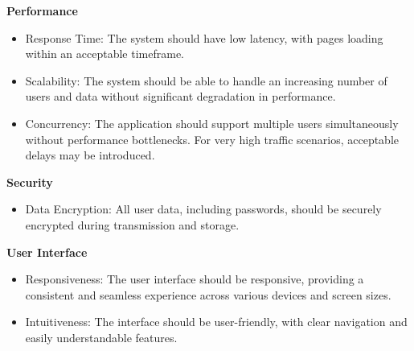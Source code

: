 \textbf{Performance}

\begin{itemize}
    \item Response Time: The system should have low latency, with pages loading within an acceptable timeframe.
    \item Scalability: The system should be able to handle an increasing number of users and data without significant degradation in performance.
    \item Concurrency: The application should support multiple users simultaneously without performance bottlenecks. For very high traffic scenarios, acceptable delays may be introduced.
\end{itemize}

\textbf{Security}

\begin{itemize}
    \item Data Encryption: All user data, including passwords, should be securely encrypted during transmission and storage.
\end{itemize}

\textbf{User Interface}

\begin{itemize}
    \item Responsiveness: The user interface should be responsive, providing a consistent and seamless experience across various devices and screen sizes.
    \item Intuitiveness: The interface should be user-friendly, with clear navigation and easily understandable features.
\end{itemize}

